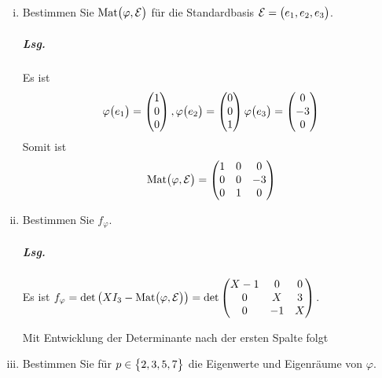 \documentclass{scrreprt}
\begin{document}
\begin{enumerate}[(i)]
\item Bestimmen Sie $\text{Mat}\qty\big(\varphi, \mathcal{E})$ für die
  Standardbasis $\mathcal{E} = \qty\big(e_1, e_2, e_3)$.

  \subparagraph{Lsg.} Es ist
  \[
    \varphi\qty\big(e_1) = \begin{pmatrix}1\\0\\0\end{pmatrix},
    \varphi\qty\big(e_2) = \begin{pmatrix}0\\0\\1\end{pmatrix}
    \varphi\qty\big(e_3) = \begin{pmatrix}0\\-3\\0\end{pmatrix}
  \]
  Somit ist
  \[
    \text{Mat}\qty\big(\varphi, \mathcal{E}) = \begin{pmatrix}
      1 & 0 & 0 \\
      0 & 0 & -3 \\
      0 & 1 & 0 \\
    \end{pmatrix}
  \]

\item Bestimmen Sie $f_{\varphi}$.

  \subparagraph{Lsg.} Es ist $f_{\varphi} =
  \det\qty\big(XI_3 - \text{Mat}\qty\big(\varphi, \mathcal{E}))
  = \det\begin{pmatrix}
    X - 1 & 0 & 0 \\
    0 & X & 3 \\
    0 & -1 & X \\
  \end{pmatrix}$.

  Mit Entwicklung der Determinante nach der ersten Spalte folgt

\item Bestimmen Sie für $p \in \qty\big{2, 3, 5, 7}$ die Eigenwerte und
  Eigenräume von $\varphi$.


\end{enumerate}
\end{document}
